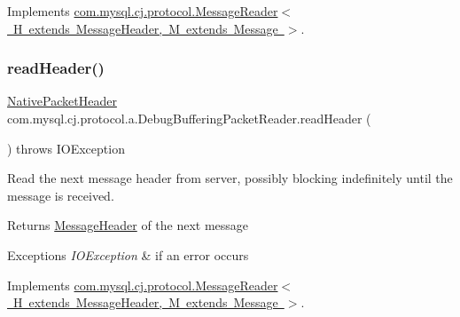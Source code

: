 Implements \mbox{\hyperlink{interfacecom_1_1mysql_1_1cj_1_1protocol_1_1_message_reader_ac4a36fb287c5308dd3d7e6157ef4e237}{com.\+mysql.\+cj.\+protocol.\+Message\+Reader$<$ H extends Message\+Header, M extends Message $>$}}.

\mbox{\label{classcom_1_1mysql_1_1cj_1_1protocol_1_1a_1_1_debug_buffering_packet_reader_a59ead81a6bb0f0b358f9e44db6b63280}} 
\subsubsection{\texorpdfstring{read\+Header()}{readHeader()}}
{\footnotesize\ttfamily \mbox{\hyperlink{classcom_1_1mysql_1_1cj_1_1protocol_1_1a_1_1_native_packet_header}{Native\+Packet\+Header}} com.\+mysql.\+cj.\+protocol.\+a.\+Debug\+Buffering\+Packet\+Reader.\+read\+Header (\begin{DoxyParamCaption}{ }\end{DoxyParamCaption}) throws I\+O\+Exception}

Read the next message header from server, possibly blocking indefinitely until the message is received.

\begin{DoxyReturn}{Returns}
\mbox{\hyperlink{interfacecom_1_1mysql_1_1cj_1_1protocol_1_1_message_header}{Message\+Header}} of the next message 
\end{DoxyReturn}

\begin{DoxyExceptions}{Exceptions}
{\em I\+O\+Exception} & if an error occurs \\
\hline
\end{DoxyExceptions}


Implements \mbox{\hyperlink{interfacecom_1_1mysql_1_1cj_1_1protocol_1_1_message_reader_a09745b0e30f74fa13e2b32f22ce70cbb}{com.\+mysql.\+cj.\+protocol.\+Message\+Reader$<$ H extends Message\+Header, M extends Message $>$}}.

\mbox{\label{classcom_1_1mysql_1_1cj_1_1protocol_1_1a_1_1_debug_buffering_packet_reader_a6739a6433fdce69bb684e15048481dc2}} 
